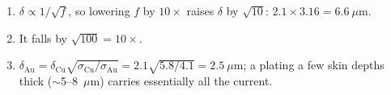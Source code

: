 \begin{enumerate}[leftmargin=1.6em,itemsep=2pt]
\item $\delta \propto 1/\sqrt{f}$, so lowering $f$ by $10\times$ raises $\delta$ by $\sqrt{10}$: $2.1\times3.16 = 6.6\ \mu\mathrm{m}$.
\item It falls by $\sqrt{100} = 10\times$.
\item $\delta_{\text{Au}} = \delta_{\text{Cu}}\sqrt{\sigma_{\text{Cu}}/\sigma_{\text{Au}}} = 2.1\sqrt{5.8/4.1} = 2.5\ \mu\mathrm{m}$; a plating a few skin depths thick ($\sim$5--8~$\mu$m) carries essentially all the current.
\end{enumerate}
